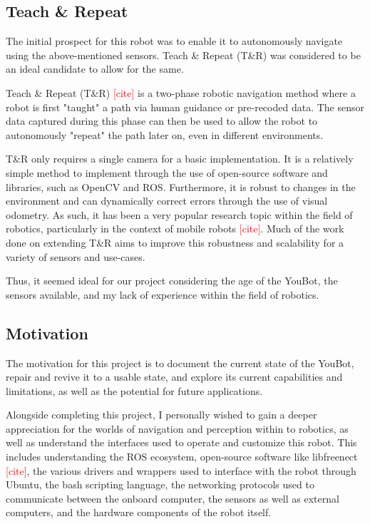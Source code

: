 \documentclass[a4paper, 12pt]{article}
\newcommand{\adi}[1]{\textcolor{red}{#1}}
\begin{document}
    \subsection{Teach \& Repeat}

    The initial prospect for this robot was to enable it to autonomously navigate using the above-mentioned sensors. Teach \& Repeat (T\&R) was considered to be an ideal candidate to allow for the same.

    Teach \& Repeat (T\&R) \adi{[cite]} is a two-phase robotic navigation method where a robot is first "taught" a path via human guidance or pre-recoded data. The sensor data captured during this phase can then be used to allow the robot to autonomously "repeat" the path later on, even in different environments.

    T\&R only requires a single camera for a basic implementation. It is a relatively simple method to implement through the use of open-source software and libraries, such as OpenCV and ROS. Furthermore, it is robust to changes in the environment and can dynamically correct errors through the use of visual odometry. As such, it has been a very popular research topic within the field of robotics, particularly in the context of mobile robots \adi{[cite]}. Much of the work done on extending T\&R aims to improve this robustness and scalability for a variety of sensors and use-cases. 
        
    Thus, it seemed ideal for our project considering the age of the YouBot, the sensors available, and my lack of experience within the field of robotics. 
    
    \subsection{Motivation}

    The motivation for this project is to document the current state of the YouBot, repair and revive it to a usable state, and explore its current capabilities and limitations, as well as the potential for future applications. 

    Alongside completing this project, I personally wished to gain a deeper appreciation for the worlds of navigation and perception within to robotics, as well as understand the interfaces used to operate and customize this robot. This includes understanding the ROS ecosystem, open-source software like libfreenect \adi{[cite]}, the various drivers and wrappers used to interface with the robot through Ubuntu, the bash scripting language, the networking protocols used to communicate between the onboard computer, the sensors as well as external computers, and the hardware components of the robot itself. 
\end{document}
